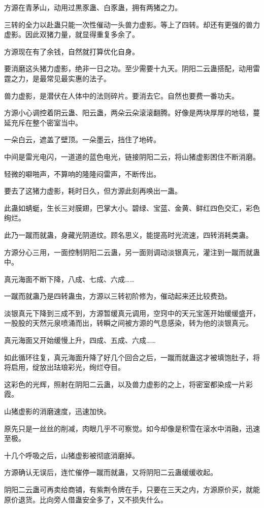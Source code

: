 \begin{this_body}
方源在青茅山，动用过黒豕蛊、白豕蛊，拥有两猪之力。

三转的全力以赴蛊只能一次性催动一头兽力虚影。等上了四转。却还有更强的兽力虚影。因此双猪力量，就显得重复多余了。

方源现在有了余钱，自然就打算优化自身。

要消磨这头猪力虚影，绝非一日之功。至少需要十九天。阴阳二云蛊搭配，动用雷霆之力，是最常见最实惠的法子。

兽力虚影，是潜伏在人体中的法则碎片。要消去它。自然也要费一番功夫。

方源小心调控着阴云蛊、阳云蛊，两朵云朵滚滚翻腾。好像是两块厚厚的地毯，蔓延充斥在整个密室当中。

一朵白云，遮盖了壁顶。一朵墨云，挡住了地砖。

中间是雷光电闪，一道道的蓝色电光，链接阴阳二云，将山猪虚影困住不断消磨。

轻微的噼啪声，不算响的隆隆闷雷声，不断传出。

要去了这猪力虚影，耗时日久，但方源此刻再唤出一蛊。

此蛊如蜻蜓，生长三对膜翅，巴掌大小。碧绿、宝蓝、金黄、鲜红四色交汇，彩色绚烂。

此乃一蹴而就蛊，身藏光阴道纹。顾名思义，能提高时光流速，四转消耗类蛊。

方源分心三用，一面控制阴阳二云蛊，另一面则调动淡银真元，灌注到一蹴而就蛊中。

真元海面不断下降，八成、七成、六成……

一蹴而就蛊乃是四转蛊虫，方源以三转初阶修为，催动起来还比较费劲。

淡银真元下降到三成不到，方源暂缓真元调用，空窍中的天元宝莲开始缓缓盛开，一股股的天然元泉喷涌而出，转瞬之间被方源的气息感染，转为他的淡银真元。

真元海面又开始缓慢上升，四成、五成、六成……

如此循环往复，真元海面升降了好几个回合之后，一蹴而就蛊这才被填饱肚子，将将启用，绽放出珐琅彩光，绚烂夺目。

这彩色的光辉，照射在阴阳二云蛊，以及兽力虚影的之上，将密室都染成一片彩霞。

山猪虚影的消磨速度，迅速加快。

原先只是一丝丝的削减，肉眼几乎不可察觉。如今却像是积雪在滚水中消融，迅速至极。

十几个呼吸之后，山猪虚影被彻底消磨掉。

方源确认无误后，连忙催停一蹴而就蛊，又将阴阳二云蛊缓缓收起。

阴阳二云蛊可再卖给商铺，有紫荆令牌在手，只要在三天之内，方源原价买，就能原价退货。比向旁人借蛊安全多了，又不损失什么。


\end{this_body}
